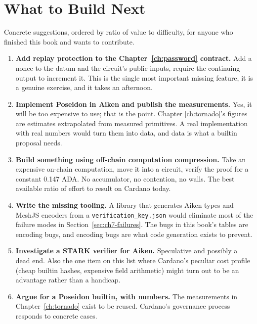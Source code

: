 \section{What to Build Next}  \label{sec:ch9-next}

Concrete suggestions, ordered by ratio of value to difficulty, for anyone who
finished this book and wants to contribute.

\begin{enumerate}
  \item \textbf{Add replay protection to the Chapter~\ref{ch:password}
        contract.} Add a nonce to the datum and the circuit's public inputs,
        require the continuing output to increment it. This is the single most
        important missing feature, it is a genuine exercise, and it takes an
        afternoon.

  \item \textbf{Implement Poseidon in Aiken and publish the measurements.} Yes,
        it will be too expensive to use; that is the point. Chapter
        \ref{ch:tornado}'s figures are estimates extrapolated from measured
        primitives. A real implementation with real numbers would turn them into
        data, and data is what a builtin proposal needs.

  \item \textbf{Build something using off-chain computation compression.} Take
        an expensive on-chain computation, move it into a circuit, verify the
        proof for a constant 0.147 ADA. No accumulator, no contention, no walls.
        The best available ratio of effort to result on Cardano today.

  \item \textbf{Write the missing tooling.} A library that generates Aiken
        types and MeshJS encoders from a \texttt{verification\_key.json} would
        eliminate most of the failure modes in
        Section~\ref{sec:ch7-failures}. The bugs in this book's tables are
        encoding bugs, and encoding bugs are what code generation exists to
        prevent.

  \item \textbf{Investigate a STARK verifier for Aiken.} Speculative and
        possibly a dead end. Also the one item on this list where Cardano's
        peculiar cost profile (cheap builtin hashes, expensive field
        arithmetic) might turn out to be an advantage rather than a handicap.

  \item \textbf{Argue for a Poseidon builtin, with numbers.} The measurements in
        Chapter~\ref{ch:tornado} exist to be reused. Cardano's governance
        process responds to concrete cases.
\end{enumerate}

